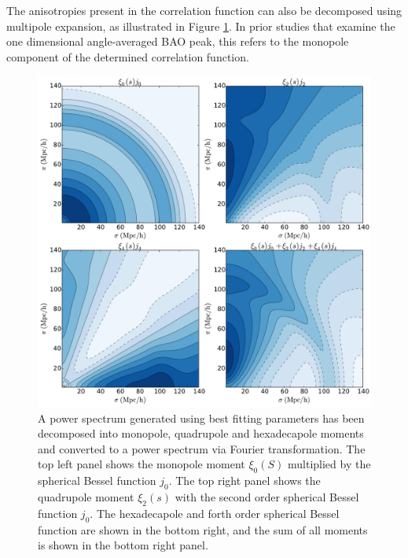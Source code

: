 \documentclass[titlesmallcaps, examinerscopy, copyrightpage]{uqthesis}
\begin{document}
The anisotropies present in the correlation function can also be decomposed using multipole expansion, as illustrated in Figure \ref{fig:xi2d}. In prior studies that examine the one dimensional angle-averaged BAO peak, this refers to the monopole component of the determined correlation function.

\begin{figure}[h!]
  \begin{center}
    \includegraphics[width=\textwidth]{images/xi2d.pdf}
  \end{center}
  \caption{A power spectrum generated using best fitting \citet{Planck201416} parameters has been decomposed into monopole, quadrupole and hexadecapole moments and converted to a power spectrum via Fourier transformation. The top left panel shows the monopole moment $\xi_0(S)$ multiplied by the spherical Bessel function $j_0$. The top right panel shows the quadrupole moment $\xi_2(s)$ with the second order spherical Bessel function $j_0$. The hexadecapole and forth order spherical Bessel function are shown in the bottom right, and the sum of all moments is shown in the bottom right panel.}
  \label{fig:xi2d}
\end{figure}
\end{document}
